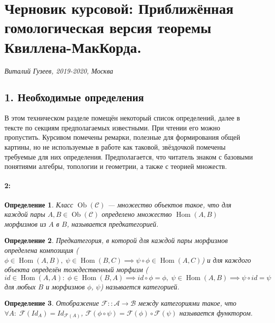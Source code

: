 \documentclass[a4paper,12pt]{report}
\newtheorem{definition}{Определение}
\begin{document}
	\section*{Черновик курсовой: Приближённая гомологическая версия теоремы Квиллена-МакКорда.}
  \textit{Виталий Гузеев, 2019-2020, Москва}

  \hrulefill

\subsection*{1. Необходимые определения}
В этом техническом разделе помещён некоторый список определений, далее в тексте по секциям предполагаемых известными. При чтении его можно пропустить. Курсивом помечены ремарки, полезные для формирования общей картины, но не используемые в работе как таковой, звёздочкой помечены требуемые для них определения. Предполагается, что читатель знаком с базовыми понятиями алгебры, топологии и геометрии, а также с теорией множеств.\\
\paragraph*{2:}

\begin{definition}
Класс $\operatorname{Ob}(\mathcal{C})$ --- множество объектов такое, что для каждой пары $A,B \in \operatorname{Ob}(\mathcal{C})$ определено множество $\operatorname{Hom}(A,B)$ морфизмов из $A$ в $B$, называется предкатегорией.
\end{definition}

\begin{definition}
Предкатегория, в которой для каждой пары морфизмов определена композиция ($\phi \in \operatorname{Hom}(A,B),\; \psi \in \operatorname{Hom}(B,C) \implies \psi \circ \phi \in \operatorname{Hom}(A,C)$) и для каждого объекта определён тождественный морфизм
($id \in \operatorname{Hom}(A,A):\; \phi \in \operatorname{Hom}(B,A) \implies id \circ \phi = \phi,\; \psi \in \operatorname{Hom}(A,B) \implies \psi \circ id = \psi$ для любых $B$ и морфизмов $\phi$, $\psi$) называется категорией.\\
\end{definition}

\begin{definition}
Отображение $\mathcal{F} :: \mathcal{A} \to \mathcal{B}$ между категориями такое, что $\forall A:\;\mathcal{F}(Id_A) = Id_{\mathcal{F}(A)}$,
$\mathcal{F}(\phi \circ \psi) = \mathcal{F}(\phi) \circ \mathcal{F}(\psi)$ называется функтором.
\end{definition}
\end{document}
